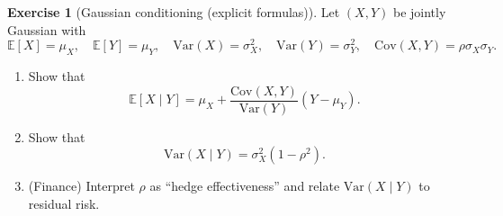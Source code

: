 \documentclass[11pt]{article}
\newcommand{\1}{\mathbf{1}}
\theoremstyle{definition}
\newtheorem{exercise}{Exercise}[section]
\begin{document}
\begin{exercise}[Gaussian conditioning (explicit formulas)]
Let $(X,Y)$ be jointly Gaussian with
$$
\mathbb E[X]=\mu_X,\quad \mathbb E[Y]=\mu_Y,\quad
\mathrm{Var}(X)=\sigma_X^2,\quad \mathrm{Var}(Y)=\sigma_Y^2,\quad
\mathrm{Cov}(X,Y)=\rho\sigma_X\sigma_Y.
$$
\begin{enumerate}[label=\textbf{(\alph*)}, itemsep=0.25em]
  \item Show that
  $$
  \mathbb E[X\mid Y]=\mu_X+\frac{\mathrm{Cov}(X,Y)}{\mathrm{Var}(Y)}(Y-\mu_Y).
  $$
  \item Show that
  $$
  \mathrm{Var}(X\mid Y)=\sigma_X^2(1-\rho^2).
  $$
  \item (Finance) Interpret $\rho$ as ``hedge effectiveness'' and relate $\mathrm{Var}(X\mid Y)$ to residual risk.
\end{enumerate}
\end{exercise}
\end{document}
